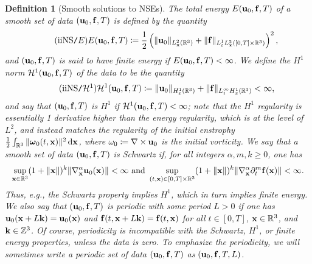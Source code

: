\documentclass{article}
\numberwithin{equation}{section}
\newtheorem{definition}{Definition}[section]
\begin{document}
\begin{definition}[Smooth solutions to NSEs]
	The \emph{total energy} $E({\bf u}_0,{\bf f},T)$ of a smooth set of data $({\bf u}_0,{\bf f},T)$ is defined by the quantity
	\begin{align}
		\label{total energy}
		\tag{iiNS\texttt{/}$E$}
		E({\bf u}_0,{\bf f},T)\coloneqq\frac{1}{2}\left(\|{\bf u}_0\|_{L_{\bf x}^2(\mathbb{R}^3)} + \|{\bf f}\|_{L_t^1L_{\bf x}^2([0,T]\times\mathbb{R}^3)}\right)^2,
	\end{align}
	and $({\bf u}_0,{\bf f},T)$ is said to have \emph{finite energy} if $E({\bf u}_0,{\bf f},T) < \infty$. We define the \emph{$H^1$ norm} $\mathcal{H}^1({\bf u}_0,{\bf f},T)$ of the data to be the quantity
	\begin{align}
		\label{H^1 norm of data}
		\tag{iiNS\texttt{/}$\mathcal{H}^1$}
		\mathcal{H}^1({\bf u}_0,{\bf f},T)\coloneqq\|{\bf u}_0\|_{H_x^1(\mathbb{R}^3)} + \|{\bf f}\|_{L_t^\infty H_x^1(\mathbb{R}^3)} < \infty,
	\end{align}
	and say that \emph{$({\bf u}_0,{\bf f},T)$ is $H^1$} if $\mathcal{H}^1({\bf u}_0,{\bf f},T) < \infty$; note that the $H^1$ regularity is essentially 1 derivative higher than the energy regularity, which is at the level of $L^2$, and instead matches the regularity of the \emph{initial enstrophy} $\frac{1}{2}\int_{\mathbb{R}^3} \|\boldsymbol{\omega}_0(t,{\bf x})\|^2\,{\rm d}{\bf x}$, where $\omega_0\coloneqq\nabla\times{\bf u}_0$ is the \emph{initial vorticity}. We say that a smooth set of data $({\bf u}_0,{\bf f},T)$ is \emph{Schwartz} if, for all integers $\alpha,m,k\ge 0$, one has
	\begin{align}
		\sup_{{\bf x}\in\mathbb{R}^3} (1 + \|{\bf x}\|)^k\|\nabla_{\bf x}^\alpha{\bf u}_0({\bf x})\| < \infty\mbox{ and }\sup_{(t,{\bf x})\in[0,T]\times\mathbb{R}^3} (1 + \|{\bf x}\|)^k\|\nabla_{\bf x}^\alpha\partial_t^m{\bf f}({\bf x})\| < \infty.
	\end{align}
	Thus, e.g., the Schwartz property implies $H^1$, which in turn implies finite energy. We also say that $({\bf u}_0,{\bf f},T)$ is \emph{periodic} with some period $L > 0$ if one has ${\bf u}_0({\bf x} + L{\bf k}) = {\bf u}_0({\bf x})$ and ${\bf f}(t,{\bf x} + L{\bf k}) = {\bf f}(t,{\bf x})$ for all $t\in[0,T]$, ${\bf x}\in\mathbb{R}^3$, and ${\bf k}\in\mathbb{Z}^3$. Of course, periodicity is incompatible with the Schwartz, $H^1$, or finite energy properties, unless the data is zero. To emphasize the periodicity, we will sometimes write a periodic set of data $({\bf u}_0,{\bf f},T)$ as $({\bf u}_0,{\bf f},T,L)$.
	

\end{definition}
\end{document}
